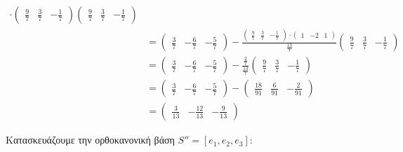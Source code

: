 \documentclass[12pt, fleqn, leqno]{extreport}
\begin{document}
\begin{equation}
\begin{split}
{            \cdot
            \begin{pmatrix}
                \frac{9}{7} & \frac{3}{7} & -\frac{1}{7}
            \end{pmatrix}
        }
        \begin{pmatrix}
            \frac{9}{7} & \frac{3}{7} & -\frac{1}{7}
        \end{pmatrix}
        \\ &=
        \begin{pmatrix}
            \frac{3}{7} & -\frac{6}{7} & -\frac{5}{7}
        \end{pmatrix}
        - \frac{
            \begin{pmatrix}
                \frac{9}{7} & \frac{3}{7} & -\frac{1}{7}
            \end{pmatrix}
            \cdot
            \begin{pmatrix}
                1 & -2 & 1
            \end{pmatrix}
        }{
            \frac{13}{7}
        }
        \begin{pmatrix}
            \frac{9}{7} & \frac{3}{7} & -\frac{1}{7}
        \end{pmatrix}
        \\ &=
        \begin{pmatrix}
            \frac{3}{7} & -\frac{6}{7} & -\frac{5}{7}
        \end{pmatrix}
        - \frac{
            \frac{2}{7}
        }{
            \frac{13}{7}
        }
        \begin{pmatrix}
            \frac{9}{7} & \frac{3}{7} & -\frac{1}{7}
        \end{pmatrix}
        \\ &=
        \begin{pmatrix}
            \frac{3}{7} & -\frac{6}{7} & -\frac{5}{7}
        \end{pmatrix}
        -
        \begin{pmatrix}
            \frac{18}{91} & \frac{6}{91} & -\frac{2}{91}
        \end{pmatrix}
        \\ &=
        \begin{pmatrix}
            \frac{3}{13} & -\frac{12}{13} & -\frac{9}{13}
        \end{pmatrix}
    \end{split}
\end{equation}

Κατασκευάζουμε την ορθοκανονική βάση $S''=[e_{1}, e_{2}, e_{3}]$:
\end{document}
